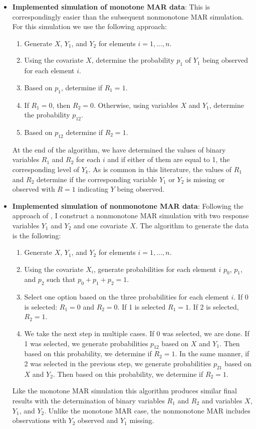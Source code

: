 \documentclass[12pt]{article}
\begin{document}
\begin{itemize}
  \item \textbf{Implemented simulation of monotone MAR data}: This is 
  correspondingly easier
  than the subsequent nonmonotone MAR simulation. For this simulation we use the 
  following approach:
  \begin{enumerate}
      \item Generate $X$, $Y_1$, and $Y_2$ for elements $i = 1, \dots, n$.
      \item Using the covariate $X$, determine the probability $p_1$ of $Y_1$
      being observed for each element $i$.
      \item Based on $p_1$, determine if $R_1 = 1$.
      \item If $R_1 = 0$, then $R_2 = 0$. Otherwise, using variables $X$ and
        $Y_1$, determine the probability $p_{12}$.
      \item Based on $p_{12}$ determine if $R_2 = 1$.
  \end{enumerate}
  At the end of the algorithm, we have determined the values of binary variables
    $R_1$ and $R_2$ for each $i$ and if either of them are equal to 1, the
    corresponding level of $Y_{k}$. As is common in this literature, the values
    of $R_1$ and $R_2$ determine if the corresponding variable $Y_1$ or $Y_2$ is
    missing or observed with $R = 1$ indicating $Y$ being observed.
  
  \item \textbf{Implemented simulation of nonmonotone MAR data}: 
  Following the approach
    of \cite{robins1997non}, I construct a nonmonotone MAR simulation with two 
    response variables $Y_1$ and $Y_2$ and one covariate $X$. The algorithm to
    generate the data is the following:
    \begin{enumerate}
        \item Generate $X$, $Y_1$, and $Y_2$ for elements $i = 1, \dots, n$.
        \item Using the covariate $X_i$, generate probabilities for each element
          $i$ $p_0$, $p_1$, and $p_2$ such that $p_0 + p_1 + p_2 = 1$. 
        \item Select one option based on the three probabilities for each
          element $i$. If 0 is selected: $R_1 = 0$ and $R_2 = 0$. If 1 is
          selected $R_1 = 1$. If 2 is selected, $R_2 = 1$.
        \item We take the next step in multiple cases. If 0 was selected, we are
          done. If 1 was selected, we generate probabilities $p_{12}$ based on
          $X$ and $Y_1$. Then based on this probability, we determine if $R_2 =
          1$. In the same manner, if 2 was selected in the previous step, we
          generate probabilities $p_{21}$ based on $X$ and $Y_2$. Then based on
          this probability, we determine if $R_2 = 1$.
    \end{enumerate}
    Like the monotone MAR simulation this algorithm produces similar final
    results with the determination of binary variables $R_1$ and $R_2$ and
    variables $X$, $Y_1$, and $Y_2$. Unlike the monotone MAR case, the
    nonmonotone MAR includes observations with $Y_2$ observed and $Y_1$ missing.
    

\end{itemize}
\end{document}
